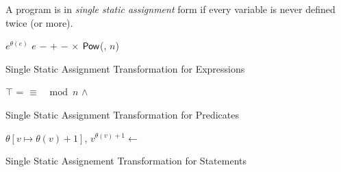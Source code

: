 
\begin{definition}
  A program is in \emph{single static assignment} form if every
  variable is never defined twice (or more).
\end{definition}

\begin{algorithm}
  \begin{algorithmic}[1]
       \Return $e^{\theta(e)}$ \EndCase
       \Return $e$ \EndCase
       \Return $-$ \EndCase
        \Return {} $+$ 
      \EndCase
        \Return {} $-$ 
      \EndCase
        \Return {} $\times$ 
      \EndCase
        \Return $\mbox{\textsf{Pow}}$(, $n$)
      \EndCase
    \EndMatch
    \EndFunction
  \end{algorithmic}
  \caption{Single Static Assignment Transformation for Expressions}
\end{algorithm}

\begin{algorithm}
  \begin{algorithmic}[1]
      \Case{$\top$} \Return $\top$ \EndCase
        \Return {} = 
      \EndCase
        \Return {} $\equiv$ 
                 $\mod n$
      \EndCase
        \Return {} $\wedge$
      \EndCase
    \EndMatch
    \EndFunction
  \end{algorithmic}
  \caption{Single Static Assignment Transformation for Predicates}
\end{algorithm}

\begin{algorithm}
  \begin{algorithmic}[1]
        \Return $\theta[v \mapsto \theta(v) + 1]$, 
                $v^{\theta(v) + 1} \leftarrow$ 
      \EndCase
      \EndCase
    \EndMatch
    \EndFunction
  \end{algorithmic}
  \caption{Single Static Assignement Transformation for Statements}
\end{algorithm}


